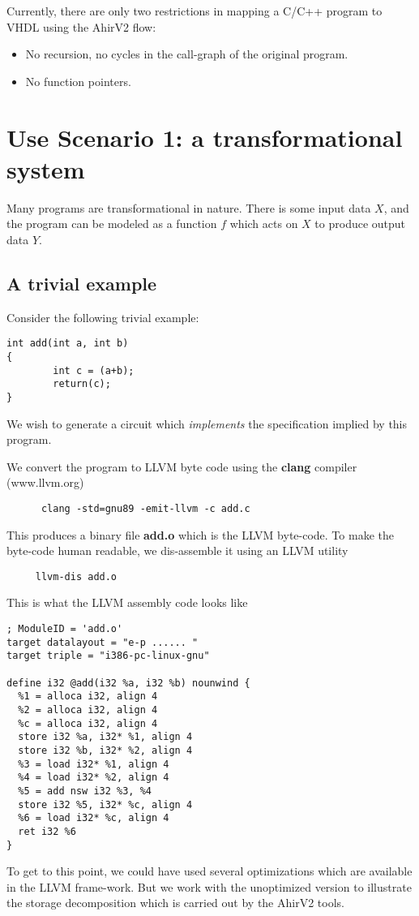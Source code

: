 Currently, there are only two restrictions in mapping
a C/C++ program to VHDL using the AhirV2 flow:
\begin{itemize}
\item No recursion, no cycles in the call-graph of the original
program.
\item No function pointers.
\end{itemize}

\section{Use Scenario 1:  a transformational system}

Many programs are transformational in nature.  There
is some input data $X$, and the program can be modeled as
a function $f$ which acts on $X$ to produce output data $Y$.

\subsection{A trivial example} \label{sec:Example}


Consider the following trivial example:
\begin{verbatim}
int add(int a, int b)
{
        int c = (a+b);
        return(c);
}
\end{verbatim}
We wish to generate a circuit which {\em implements}
the specification implied by this program.

We convert the program to LLVM byte code using
the {\bf clang} compiler (www.llvm.org)
\begin{verbatim}
      clang -std=gnu89 -emit-llvm -c add.c
\end{verbatim}
This produces a binary file {\bf add.o} which is
the LLVM byte-code.  To make the byte-code human
readable, we dis-assemble it using an LLVM utility
\begin{verbatim}
     llvm-dis add.o
\end{verbatim}
This is what the LLVM assembly code looks like
\begin{verbatim}
; ModuleID = 'add.o'
target datalayout = "e-p ...... "
target triple = "i386-pc-linux-gnu"

define i32 @add(i32 %a, i32 %b) nounwind {
  %1 = alloca i32, align 4
  %2 = alloca i32, align 4
  %c = alloca i32, align 4
  store i32 %a, i32* %1, align 4
  store i32 %b, i32* %2, align 4
  %3 = load i32* %1, align 4
  %4 = load i32* %2, align 4
  %5 = add nsw i32 %3, %4
  store i32 %5, i32* %c, align 4
  %6 = load i32* %c, align 4
  ret i32 %6
}
\end{verbatim}
To get to this point, we could have used several
optimizations which are available in the LLVM frame-work.
But we work with the unoptimized version to illustrate
the storage decomposition which is carried out by
the AhirV2 tools.

